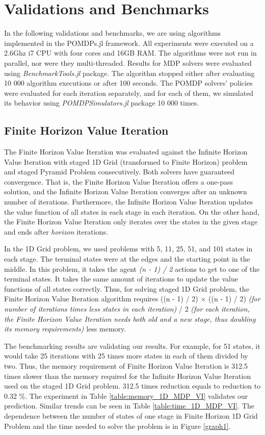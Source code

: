 \section{Validations and Benchmarks}

In the following validations and benchmarks, we are using algorithms implemented in the POMDPs.jl framework. All experiments were executed on a 2.6Ghz i7 CPU with four cores and 16GB RAM. The algorithms were not run in parallel, nor were they multi-threaded. Results for MDP solvers were evaluated using \textit{BenchmarkTools.jl} package. The algorithm stopped either after evaluating 10 000 algorithm executions or after 100 seconds. The POMDP solvers' policies were evaluated for each iteration separately, and for each of them, we simulated its behavior using \textit{POMDPSimulators.jl} package 10 000 times.

\subsection{Finite Horizon Value Iteration}
The Finite Horizon Value Iteration was evaluated against the Infinite Horizon Value Iteration with staged 1D Grid (transformed to Finite Horizon) problem and staged Pyramid Problem consecutively. Both solvers have guaranteed convergence. That is, the Finite Horizon Value Iteration offers a one-pass solution, and the Infinite Horizon Value Iteration converges after an unknown number of iterations. Furthermore, the Infinite Horizon Value Iteration updates the value function of all states in each stage in each iteration. On the other hand, the Finite Horizon Value Iteration only iterates over the states in the given stage and ends after \textit{horizon} iterations.

In the 1D Grid problem, we used problems with 5, 11, 25, 51, and 101 states in each stage. The terminal states were at the edges and the starting point in the middle. In this problem, it takes the agent \textit{(n - 1) / 2} actions to get to one of the terminal states. It takes the same amount of iterations to update the value functions of all states correctly. Thus, for solving staged 1D Grid problem, the Finite Horizon Value Iteration algorithm requires ((n - 1) / 2) $\times$ ((n - 1) / 2) \textit{(for number of iterations times less states in each iteration)} / 2 \textit{(for each iteration, the Finite Horizon Value Iteration needs both old and a new stage, thus doubling its memory requirements)} less memory. 

The benchmarking results are validating our results. For example, for 51 states, it would take 25 iterations with 25 times more states in each of them divided by two. Thus, the memory requirement of Finite Horizon Value Iteration is 312.5 times slower than the memory required for the Infinite Horizon Value Iteration used on the staged 1D Grid problem. 312.5 times reduction equals to reduction to 0.32 \%. The experiment in Table \ref{table:memory_1D_MDP_VI} validates our prediction. Similar trends can be seen in Table \ref{table:time_1D_MDP_VI}. The dependence between the number of states of one stage in Finite Horizon 1D Grid Problem and the time needed to solve the problem is in Figure \ref{graph1}.



